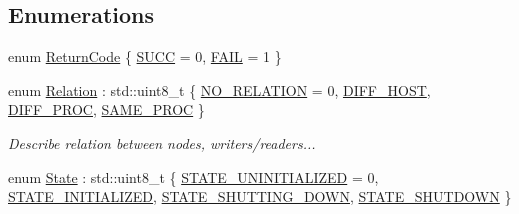 \subsection*{Enumerations}
\begin{DoxyCompactItemize}
\item 
enum \hyperlink{namespaceapollo_1_1cyber_a298e1f58b6356669bacadaea997db48d}{Return\-Code} \{ \hyperlink{namespaceapollo_1_1cyber_a298e1f58b6356669bacadaea997db48da2b12fbcd159fbe47330598658e6fc8cf}{S\-U\-C\-C} = 0, 
\hyperlink{namespaceapollo_1_1cyber_a298e1f58b6356669bacadaea997db48da1426f2ef237bd2bc6ca60666d9bb9bb1}{F\-A\-I\-L} = 1
 \}
\item 
enum \hyperlink{namespaceapollo_1_1cyber_a688ac951fd0a3965da4acdc34c92e50f}{Relation} \-: std\-::uint8\-\_\-t \{ \hyperlink{namespaceapollo_1_1cyber_a688ac951fd0a3965da4acdc34c92e50fa08c8231469e4d43ae97e69aba0d7ffac}{N\-O\-\_\-\-R\-E\-L\-A\-T\-I\-O\-N} = 0, 
\hyperlink{namespaceapollo_1_1cyber_a688ac951fd0a3965da4acdc34c92e50fa437fe696ed665d7f0fd4dd78f6a6e7d2}{D\-I\-F\-F\-\_\-\-H\-O\-S\-T}, 
\hyperlink{namespaceapollo_1_1cyber_a688ac951fd0a3965da4acdc34c92e50fa5a156a8281f940434f125c8bc72c3229}{D\-I\-F\-F\-\_\-\-P\-R\-O\-C}, 
\hyperlink{namespaceapollo_1_1cyber_a688ac951fd0a3965da4acdc34c92e50fa9ce42e91aec5ba46e0bf027677ca670d}{S\-A\-M\-E\-\_\-\-P\-R\-O\-C}
 \}
\begin{DoxyCompactList}\small\item\em Describe relation between nodes, writers/readers... \end{DoxyCompactList}\item 
enum \hyperlink{namespaceapollo_1_1cyber_a97c79b3d3aae7ac07954617b97cadaa6}{State} \-: std\-::uint8\-\_\-t \{ \hyperlink{namespaceapollo_1_1cyber_a97c79b3d3aae7ac07954617b97cadaa6ad7a98aece89924aaff3ca138dfc60e44}{S\-T\-A\-T\-E\-\_\-\-U\-N\-I\-N\-I\-T\-I\-A\-L\-I\-Z\-E\-D} = 0, 
\hyperlink{namespaceapollo_1_1cyber_a97c79b3d3aae7ac07954617b97cadaa6a157e40c81c50947b27e1846495081a2f}{S\-T\-A\-T\-E\-\_\-\-I\-N\-I\-T\-I\-A\-L\-I\-Z\-E\-D}, 
\hyperlink{namespaceapollo_1_1cyber_a97c79b3d3aae7ac07954617b97cadaa6a218e157725d6c01dada7dc501212fcb5}{S\-T\-A\-T\-E\-\_\-\-S\-H\-U\-T\-T\-I\-N\-G\-\_\-\-D\-O\-W\-N}, 
\hyperlink{namespaceapollo_1_1cyber_a97c79b3d3aae7ac07954617b97cadaa6a1a22b6400076d9cc7aa045757d704fbe}{S\-T\-A\-T\-E\-\_\-\-S\-H\-U\-T\-D\-O\-W\-N}
 \}
\end{DoxyCompactItemize}
